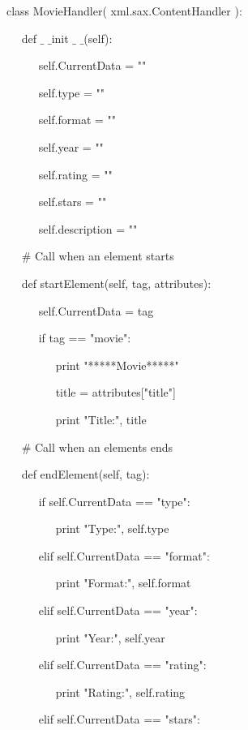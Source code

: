 \vspace{12pt}
\noindent 
class MovieHandler( xml.sax.ContentHandler ): \par
\noindent 
~~ def  $  \_  $ $  \_  $init $  \_  $ $  \_  $(self): \par
\noindent 
~~~~~ self.CurrentData = "" \par
\noindent 
~~~~~ self.type = "" \par
\noindent 
~~~~~ self.format = "" \par
\noindent 
~~~~~ self.year = "" \par
\noindent 
~~~~~ self.rating = "" \par
\noindent 
~~~~~ self.stars = "" \par
\noindent 
~~~~~ self.description = "" \par
\vspace{12pt}
\noindent 
~~  $  \#  $ Call when an element starts \par
\noindent 
~~ def startElement(self, tag, attributes): \par
\noindent 
~~~~~ self.CurrentData = tag \par
\noindent 
~~~~~ if tag == "movie": \par
\noindent 
~~~~~~~~ print "*****Movie*****" \par
\noindent 
~~~~~~~~ title = attributes["title"] \par
\noindent 
~~~~~~~~ print "Title:", title \par
\vspace{12pt}
\noindent 
~~  $  \#  $ Call when an elements ends \par
\noindent 
~~ def endElement(self, tag): \par
\noindent 
~~~~~ if self.CurrentData == "type": \par
\noindent 
~~~~~~~~ print "Type:", self.type \par
\noindent 
~~~~~ elif self.CurrentData == "format": \par
\noindent 
~~~~~~~~ print "Format:", self.format \par
\noindent 
~~~~~ elif self.CurrentData == "year": \par
\noindent 
~~~~~~~~ print "Year:", self.year \par
\noindent 
~~~~~ elif self.CurrentData == "rating": \par
\noindent 
~~~~~~~~ print "Rating:", self.rating \par
\noindent 
~~~~~ elif self.CurrentData == "stars": \par
\noindent 
